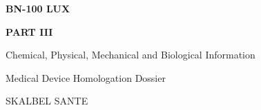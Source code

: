 \documentclass[12pt,a4paper]{report}
\begin{document}

\begin{titlepage}
    \centering

    \vspace*{3cm}

    {\Huge\bfseries BN-100 LUX\par}

    \vspace{1cm}

    {\LARGE\bfseries PART III\par}

    \vspace{0.5cm}

    {\Large Chemical, Physical, Mechanical and Biological Information\par}

    \vfill

    {\large Medical Device Homologation Dossier\par}

    \vspace{0.5cm}

    {\large SKALBEL SANTE\par}

    \vspace{2cm}
\end{titlepage}


\setcounter{tocdepth}{2}

\tableofcontents
\clearpage





\setcounter{chapter}{3}
\setcounter{section}{0}








\end{document}
